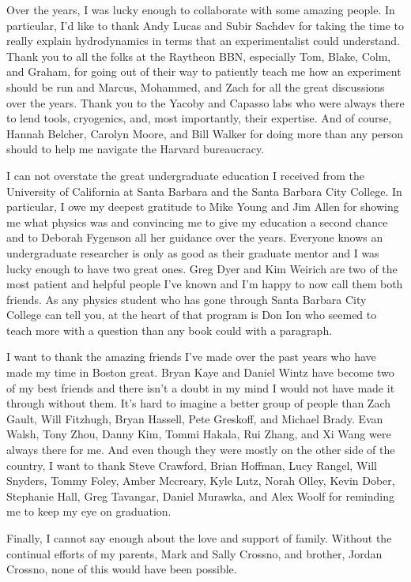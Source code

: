 Over the years, I was lucky enough to collaborate with some amazing people. In particular, I'd like to thank Andy Lucas and Subir Sachdev for taking the time to really explain hydrodynamics in terms that an experimentalist could understand. Thank you to all the folks at the Raytheon BBN, especially Tom, Blake, Colm, and Graham, for going out of their way to patiently teach me how an experiment should be run and Marcus, Mohammed, and Zach for all the great discussions over the years. Thank you to the Yacoby and Capasso labs who were always there to lend tools, cryogenics, and, most importantly, their expertise. And of course, Hannah Belcher, Carolyn Moore, and Bill Walker for doing more than any person should to help me navigate the Harvard bureaucracy.

I can not overstate the great undergraduate education I received from the University of California at Santa Barbara and the Santa Barbara City College. In particular, I owe my deepest gratitude to Mike Young and Jim Allen for showing me what physics was and convincing me to give my education a second chance and to Deborah Fygenson all her guidance over the years. Everyone knows an undergraduate researcher is only as good as their graduate mentor and I was lucky enough to have two great ones. Greg Dyer and Kim Weirich are two of the most patient and helpful people I've known and I'm happy to now call them both friends. As any physics student who has gone through Santa Barbara City College can tell you, at the heart of that program is Don Ion who seemed to teach more with a question than any book could with a paragraph.

I want to thank the amazing friends I've made over the past years who have made my time in Boston great. Bryan Kaye and Daniel Wintz have become two of my best friends and there isn't a doubt in my mind I would not have made it through without them. It's hard to imagine a better group of people than Zach Gault, Will Fitzhugh, Bryan Hassell, Pete Greskoff, and Michael Brady. Evan Walsh, Tony Zhou, Danny Kim, Tommi Hakala, Rui Zhang, and Xi Wang were always there for me. And even though they were mostly on the other side of the country, I want to thank Steve Crawford, Brian Hoffman, Lucy Rangel, Will Snyders, Tommy Foley, Amber Mccreary, Kyle Lutz, Norah Olley, Kevin Dober, Stephanie Hall, Greg Tavangar, Daniel Murawka, and Alex Woolf for reminding me to keep my eye on graduation. 

Finally, I cannot say enough about the love and support of family. Without the continual efforts of my parents, Mark and Sally Crossno, and brother, Jordan Crossno, none of this would have been possible. 